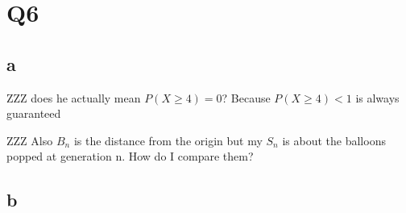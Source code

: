 \documentclass{article}
\begin{document}
\section{Q6}
\subsection{a}
ZZZ does he actually mean $P(X \geq 4) = 0$? Because $P(X \geq 4) < 1$ is always
guaranteed

ZZZ Also $B_n$ is the distance from the origin but my $S_n$ is about the balloons
popped at generation n. How do I compare them?

\subsection{b}
\end{document}
